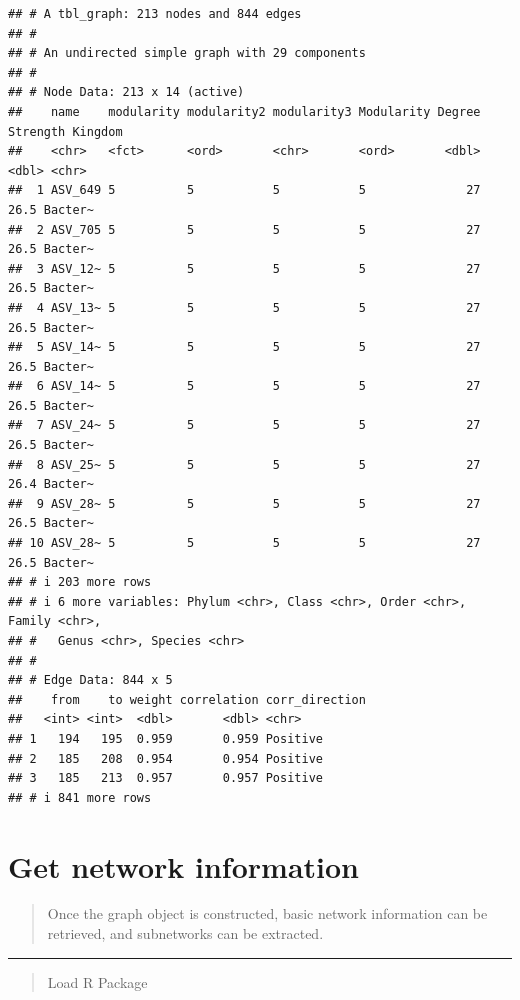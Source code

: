 \documentclass[
]{book}
\begin{document}
\begin{verbatim}
## # A tbl_graph: 213 nodes and 844 edges
## #
## # An undirected simple graph with 29 components
## #
## # Node Data: 213 x 14 (active)
##    name    modularity modularity2 modularity3 Modularity Degree Strength Kingdom
##    <chr>   <fct>      <ord>       <chr>       <ord>       <dbl>    <dbl> <chr>  
##  1 ASV_649 5          5           5           5              27     26.5 Bacter~
##  2 ASV_705 5          5           5           5              27     26.5 Bacter~
##  3 ASV_12~ 5          5           5           5              27     26.5 Bacter~
##  4 ASV_13~ 5          5           5           5              27     26.5 Bacter~
##  5 ASV_14~ 5          5           5           5              27     26.5 Bacter~
##  6 ASV_14~ 5          5           5           5              27     26.5 Bacter~
##  7 ASV_24~ 5          5           5           5              27     26.5 Bacter~
##  8 ASV_25~ 5          5           5           5              27     26.4 Bacter~
##  9 ASV_28~ 5          5           5           5              27     26.5 Bacter~
## 10 ASV_28~ 5          5           5           5              27     26.5 Bacter~
## # i 203 more rows
## # i 6 more variables: Phylum <chr>, Class <chr>, Order <chr>, Family <chr>,
## #   Genus <chr>, Species <chr>
## #
## # Edge Data: 844 x 5
##    from    to weight correlation corr_direction
##   <int> <int>  <dbl>       <dbl> <chr>         
## 1   194   195  0.959       0.959 Positive      
## 2   185   208  0.954       0.954 Positive      
## 3   185   213  0.957       0.957 Positive      
## # i 841 more rows
\end{verbatim}

\chapter{Get network information}\label{get-network-information}

\begin{quote}
Once the graph object is constructed, basic network information can be retrieved, and subnetworks can be extracted.
\end{quote}

\begin{center}\rule{0.5\linewidth}{0.5pt}\end{center}

\begin{quote}
Load R Package
\end{quote}
\end{document}
